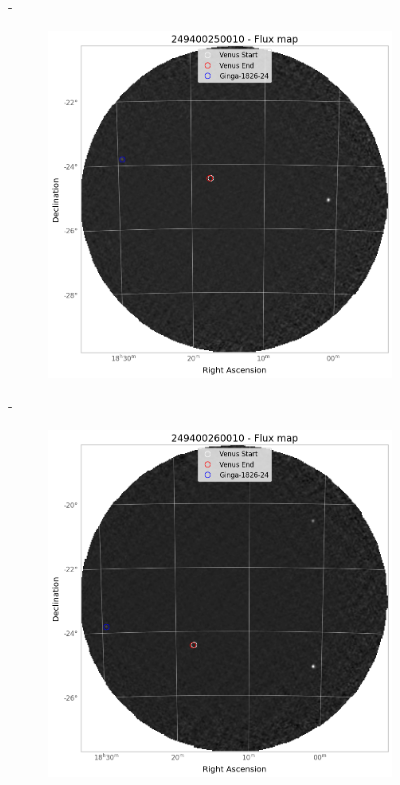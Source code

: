 \begin{figure}[H]
\begin{subfigure}{.3\textwidth}
        \end{subfigure}
        \hspace{1em}-
        \begin{subfigure}{.3\textwidth}
            \centering
            \includegraphics[width=\textwidth]{report/Figures/methods/2204/25_map.png}
        \end{subfigure}
        \hspace{1em}-
        \begin{subfigure}{.3\textwidth}
            \centering
            \includegraphics[width=\textwidth]{report/Figures/methods/2204/26_map.png}

\end{subfigure}
\end{figure}
